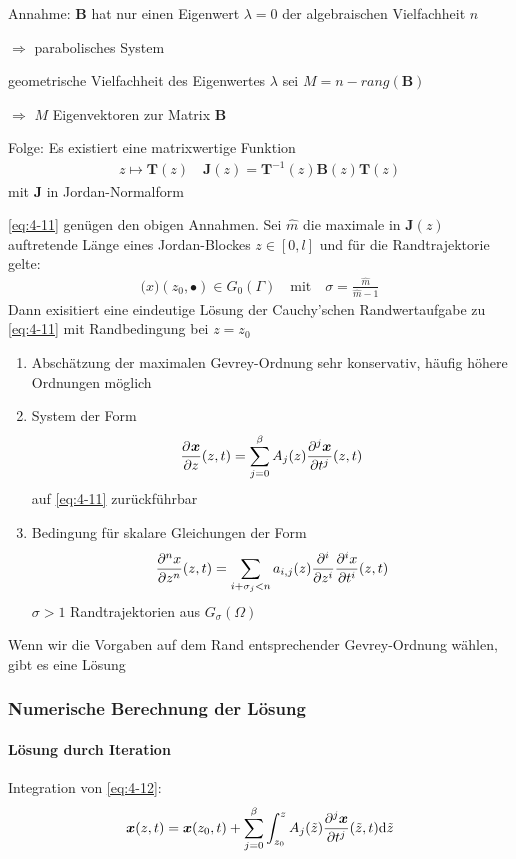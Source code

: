 Annahme: $\bm{B}$ hat nur einen Eigenwert $\lambda=0$ der algebraischen Vielfachheit $n$ 

$\Rightarrow$ parabolisches System

geometrische Vielfachheit des Eigenwertes $\lambda$ sei $M=n-rang(\bm{B})$ 

$\Rightarrow$ $M$ Eigenvektoren zur Matrix $\bm{B}$

Folge: Es existiert eine matrixwertige Funktion
\begin{align*}
z\mapsto\bm{T}(z) \quad \bm{J}(z)=\bm{T}^{-1}(z)\bm{B}(z)\bm{T}(z)
\end{align*}
mit $\bm{J}$ in Jordan-Normalform

\begin{satz}\eqref{eq:4-11} genügen den obigen Annahmen. Sei $\hat{m}$ die maximale in $\bm{J}(z)$ auftretende Länge eines Jordan-Blockes $z\in[0,l]$ und für die Randtrajektorie gelte:
\begin{align*}
\bm(x)(z_0,\bullet)\in G_0(\Gamma) \quad \textrm{mit} \quad \sigma = \frac{\hat{m}}{\hat{m}-1}
\end{align*}
Dann exisitiert eine eindeutige Lösung der Cauchy'schen Randwertaufgabe zu \eqref{eq:4-11} mit Randbedingung bei $z=z_0$
\end{satz}
\begin{enumerate}
\item Abschätzung der maximalen Gevrey-Ordnung sehr konservativ, häufig höhere Ordnungen möglich
\item System der Form \begin{align}
\pd{\bm{x}}{z}(z,t)=\sum_{j=0}^\beta A_j(z)\pd[j]{\bm{x}}{t^j}(z,t)
\end{align}
auf \eqref{eq:4-11} zurückführbar
\item Bedingung für skalare Gleichungen der Form
\begin{align} \label{eq:4-12}
\pd[n]{x}{z^n}(z,t)=\sum_{i+\sigma_j<n}a_{i,j}(z)\pd[i]{}{z^i}\pd[i]{x}{t^i}(z,t)
\end{align}
$\sigma>1$ Randtrajektorien aus $G_\sigma(\Omega)$
\end{enumerate}
Wenn wir die Vorgaben auf dem Rand entsprechender Gevrey-Ordnung wählen, gibt es eine Lösung
\subsubsection{Numerische Berechnung der Lösung}
\paragraph{Lösung durch Iteration}
Integration von \eqref{eq:4-12}:
\begin{align*}
\bm{x}(z,t)=\bm{x}(z_0,t)+\sum_{j=0}^\beta \int_{z_0}^z A_j(\tilde{z})\pd[j]{\bm{x}}{t^j}(\tilde{z},t)\d \tilde{z}
\end{align*}
